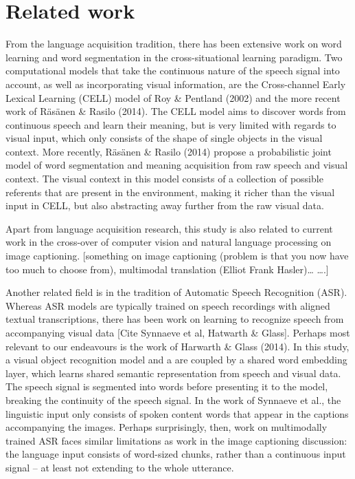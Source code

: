 \section{Related work}
From the language acquisition tradition, there has been extensive work on word learning and word segmentation in the cross-situational learning paradigm. %
Two computational models that take the continuous nature of the speech signal into account, as well as incorporating visual information, are the Cross-channel Early Lexical Learning (CELL) model of Roy \& Pentland (2002) %
and the more recent work of Räsänen \& Rasilo (2014). %
The CELL model aims to discover words from continuous speech and learn their meaning, but is very limited with regards to visual input, which only consists of the shape of single objects in the visual context. More recently, Räsänen \& Rasilo (2014) %
propose a probabilistic joint model of word segmentation and meaning acquisition from raw speech and visual context. The visual context in this model consists of a collection of possible referents that are present in the environment, making it richer than the visual input in CELL, but also abstracting away further from the raw visual data. 

Apart from language acquisition research, this study is also related to current work in the cross-over of computer vision and natural language processing on image captioning. [something on image captioning (problem is that you now have too much to choose from), multimodal translation (Elliot Frank Hasler)… ….]

Another related field is in the tradition of Automatic Speech Recognition (ASR). Whereas ASR models are typically trained on speech recordings with aligned textual transcriptions, there has been work on learning to recognize speech from accompanying visual data [Cite Synnaeve et al, Hatwarth \& Glass].%
Perhaps most relevant to our endeavours is the work of Harwarth \& Glass (2014). %
In this study, a visual object recognition model and a are coupled by a shared word embedding layer, which learns shared semantic representation from speech and visual data. The speech signal is segmented into words before presenting it to the model, breaking the continuity of the speech signal. In the work of Synnaeve et al., %
the linguistic input only consists of spoken content words that appear in the captions accompanying the images. Perhaps surprisingly, then, work on multimodally trained ASR faces similar limitations as work in the image captioning discussion: the language input consists of word-sized chunks, rather than a continuous input signal – at least not extending to the whole utterance.

